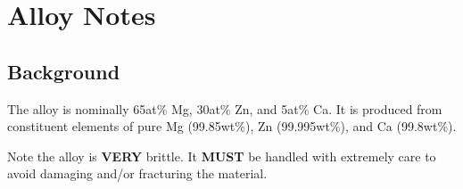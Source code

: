 \section{\MgZnCa Alloy Notes}

\subsection{Background}

The \MgZnCa alloy is nominally 65at\% Mg, 30at\% Zn, and 5at\% Ca. It is produced from constituent elements of pure Mg (99.85wt\%), Zn (99.995wt\%), and Ca (99.8wt\%). 

Note the \MgZnCa alloy is \textbf{VERY} brittle. It \textbf{MUST} be handled with extremely care to avoid damaging and/or fracturing the material.

